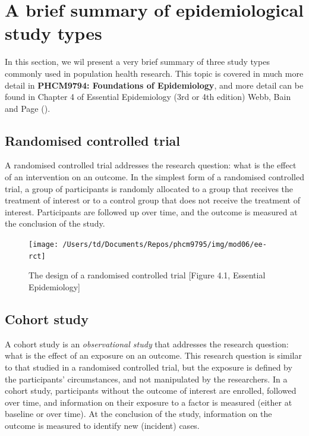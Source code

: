 \documentclass[
]{memoir}
\begin{document}
\hypertarget{a-brief-summary-of-epidemiological-study-types}{%
\section{A brief summary of epidemiological study types}\label{a-brief-summary-of-epidemiological-study-types}}

In this section, we wil present a very brief summary of three study types commonly used in population health research. This topic is covered in much more detail in \textbf{PHCM9794: Foundations of Epidemiology}, and more detail can be found in Chapter 4 of Essential Epidemiology (3rd or 4th edition) Webb, Bain and Page (\citet{webb_etal16}).

\hypertarget{randomised-controlled-trial}{%
\subsection{Randomised controlled trial}\label{randomised-controlled-trial}}

A randomised controlled trial addresses the research question: what is the effect of an intervention on an outcome. In the simplest form of a randomised controlled trial, a group of participants is randomly allocated to a group that receives the treatment of interest or to a control group that does not receive the treatment of interest. Participants are followed up over time, and the outcome is measured at the conclusion of the study.

\begin{figure}
\texttt{[image: /Users/td/Documents/Repos/phcm9795/img/mod06/ee-rct]} \caption{The design of a randomised controlled trial [Figure 4.1, Essential Epidemiology]}\label{fig:ee-fig-rct}
\end{figure}

\hypertarget{cohort-study}{%
\subsection{Cohort study}\label{cohort-study}}

A cohort study is an \emph{observational study} that addresses the research question: what is the effect of an exposure on an outcome. This research question is similar to that studied in a randomised controlled trial, but the exposure is defined by the participants' circumstances, and not manipulated by the researchers. In a cohort study, participants without the outcome of interest are enrolled, followed over time, and information on their exposure to a factor is measured (either at baseline or over time). At the conclusion of the study, information on the outcome is measured to identify new (incident) cases.
\end{document}
